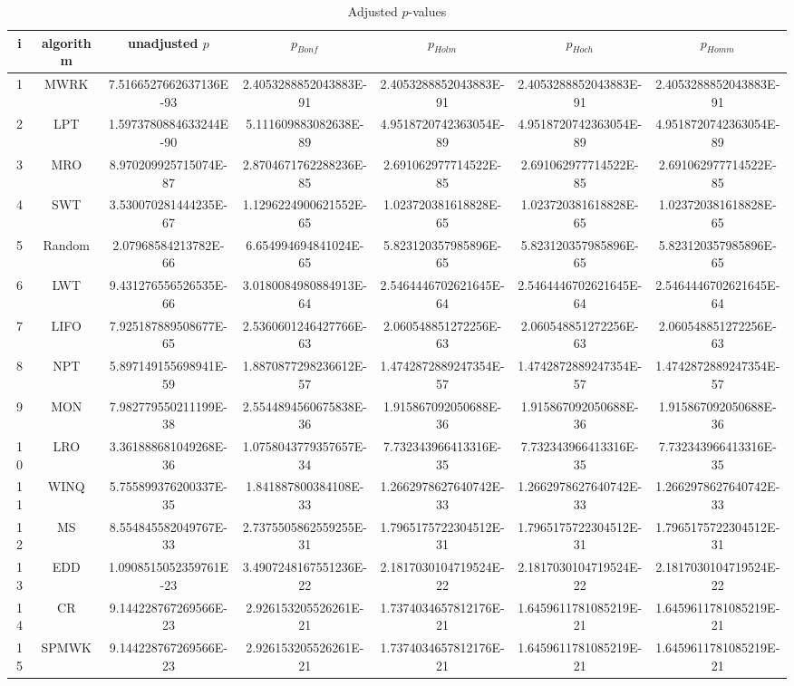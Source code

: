\documentclass[a3paper,10pt]{article}
\begin{document}
\begin{table}[!htp]
\centering\tiny
\caption{Adjusted $p$-values}
\begin{tabular}{ccccccc}
i&algorithm&unadjusted $p$&$p_{Bonf}$&$p_{Holm}$&$p_{Hoch}$&$p_{Homm}$\\
\hline
1&MWRK&7.5166527662637136E-93&2.4053288852043883E-91&2.4053288852043883E-91&2.4053288852043883E-91&2.4053288852043883E-91\\
2&LPT&1.5973780884633244E-90&5.111609883082638E-89&4.9518720742363054E-89&4.9518720742363054E-89&4.9518720742363054E-89\\
3&MRO&8.970209925715074E-87&2.8704671762288236E-85&2.691062977714522E-85&2.691062977714522E-85&2.691062977714522E-85\\
4&SWT&3.530070281444235E-67&1.1296224900621552E-65&1.023720381618828E-65&1.023720381618828E-65&1.023720381618828E-65\\
5&Random&2.07968584213782E-66&6.654994694841024E-65&5.823120357985896E-65&5.823120357985896E-65&5.823120357985896E-65\\
6&LWT&9.431276556526535E-66&3.0180084980884913E-64&2.5464446702621645E-64&2.5464446702621645E-64&2.5464446702621645E-64\\
7&LIFO&7.925187889508677E-65&2.5360601246427766E-63&2.060548851272256E-63&2.060548851272256E-63&2.060548851272256E-63\\
8&NPT&5.897149155698941E-59&1.8870877298236612E-57&1.4742872889247354E-57&1.4742872889247354E-57&1.4742872889247354E-57\\
9&MON&7.982779550211199E-38&2.5544894560675838E-36&1.915867092050688E-36&1.915867092050688E-36&1.915867092050688E-36\\
10&LRO&3.361888681049268E-36&1.0758043779357657E-34&7.732343966413316E-35&7.732343966413316E-35&7.732343966413316E-35\\
11&WINQ&5.755899376200337E-35&1.841887800384108E-33&1.2662978627640742E-33&1.2662978627640742E-33&1.2662978627640742E-33\\
12&MS&8.554845582049767E-33&2.7375505862559255E-31&1.7965175722304512E-31&1.7965175722304512E-31&1.7965175722304512E-31\\
13&EDD&1.0908515052359761E-23&3.4907248167551236E-22&2.1817030104719524E-22&2.1817030104719524E-22&2.1817030104719524E-22\\
14&CR&9.144228767269566E-23&2.926153205526261E-21&1.7374034657812176E-21&1.6459611781085219E-21&1.6459611781085219E-21\\
15&SPMWK&9.144228767269566E-23&2.926153205526261E-21&1.7374034657812176E-21&1.6459611781085219E-21&1.6459611781085219E-21\\

\end{tabular}
\end{table}
\end{document}
